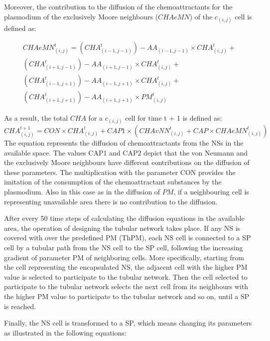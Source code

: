 Moreover, the contribution to the diffusion of the chemoattractants for the plasmodium of the exclusively Moore neighbours ($CHAeMN$) of the $c_{(i,j)}$ cell is defined as:

\begin{equation}
\begin{split}
CHAeMN^t_{(i, j)} = 
(CHA^t_{(i-1, j-1)}) - AA_{(i-1, j-1)} \times CHA^t_{(i, j)} +
\\(CHA^t_{(i+1, j-1)}) - AA_{(i+1, j-1)} \times CHA^t_{(i, j)} +
\\(CHA^t_{(i-1, j+1)}) - AA_{(i-1, j+1)} \times CHA^t_{(i, j)}  +
\\(CHA^t_{(i+1, j+1)}) - AA_{(i+1, j+1)} \times PM^t_{(i, j)}
\end{split}
\end{equation}

As a result, the total $CHA$ for a $c_{(i,j)}$ cell for time t + 1 is defined as:
\begin{equation}
CHA^{t+1}_{(i, j)} = CON \times {CHA^t_{(i, j)} + CAP1 \times (CHAvNN^t_{(i, j)} + CAP \times CHAeMN^t_{(i, j)})}
\end{equation}
The equation represents the diffusion of chemoattractants from the NSs in the available space. The values CAP1 and CAP2 depict that the von Neumann and the exclusively Moore neighbours have different contributions on the diffusion of these parameters. The multiplication with the parameter CON provides the imitation of the consumption of the chemoattractant substances by the plasmodium. Also in this case as in the diffusion of $PM$, if a neighbouring cell is representing unavailable area there is no contribution to the diffusion.

\par
After every 50 time steps of calculating the diffusion equations in the available area, the operation of designing the tubular network takes place. If any NS is covered with over the predefined PM (ThPM), each NS cell is connected to a SP cell by a tubular path from the NS cell to the SP cell, following the increasing gradient of parameter PM of neighboring cells. 
More specifically, starting from the cell representing the encapsulated NS, the adjacent cell with the higher PM value is selected to participate to the tubular network. Then the cell selected to participate to the tubular network selects the next cell from its neighbours with the higher PM value to participate to the tubular network and so on, until a SP is reached.
\par
Finally, the NS cell is transformed to a SP, which means changing its parameters as illustrated in the following equations:

